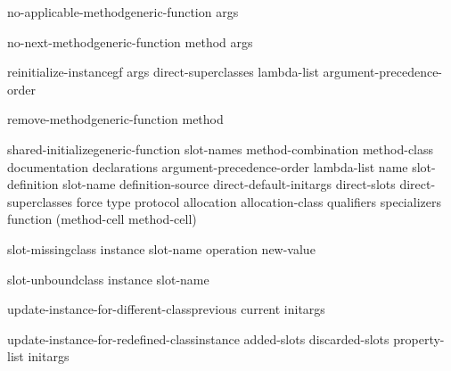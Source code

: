 \begin{generic}{no-applicable-method}{generic-function \rest args}{}{}
  
\end{generic}

\begin{generic}{no-next-method}{generic-function method \rest args}{}{}
  
\end{generic}

\begin{generic}{reinitialize-instance}{gf \rest args \key direct-superclasses lambda-list argument-precedence-order
 \akeys}{}{}
  
\end{generic}

\begin{generic}{remove-method}{generic-function method}{}{}
  
\end{generic}

\begin{generic}{shared-initialize}{generic-function slot-names \key method-combination method-class documentation
 declarations argument-precedence-order lambda-list name slot-definition
 slot-name definition-source direct-default-initargs direct-slots
 direct-superclasses force type protocol allocation allocation-class qualifiers
 specializers function (method-cell method-cell) \akeys}{}{}
  
\end{generic}

\begin{generic}{slot-missing}{class instance slot-name operation \op new-value}{}{}
  
\end{generic}

\begin{generic}{slot-unbound}{class instance slot-name}{}{}
  
\end{generic}

\begin{generic}{update-instance-for-different-class}{previous current \rest initargs}{}{}
  
\end{generic}

\begin{generic}{update-instance-for-redefined-class}{instance added-slots discarded-slots property-list \rest initargs}{}{}
  
\end{generic}

